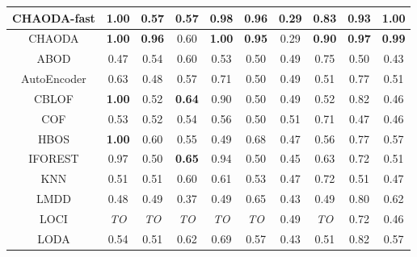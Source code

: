 \begin{table*}[!t]
\begin{center}
\begin{small}
\begin{sc}
\begin{tabular}{|c|c|c|c|c|c|c|c|c|c|}
\hline
CHAODA-fast    & \textbf{1.00} &               0.57 &          0.57 &     \textbf{0.98} & \textbf{0.96} &          0.29 &   \textbf{0.83} &          0.93 & \textbf{1.00} \\
\hline
CHAODA         & \textbf{1.00} &      \textbf{0.96} &          0.60 &     \textbf{1.00} & \textbf{0.95} &          0.29 &   \textbf{0.90} & \textbf{0.97} & \textbf{0.99} \\
\hline
ABOD           &          0.47 &               0.54 &          0.60 &              0.53 &          0.50 &          0.49 &            0.75 &          0.50 &          0.43 \\
\hline
AutoEncoder    &          0.63 &               0.48 &          0.57 &              0.71 &          0.50 &          0.49 &            0.51 &          0.77 &          0.51 \\
\hline
CBLOF          & \textbf{1.00} &               0.52 & \textbf{0.64} &              0.90 &          0.50 &          0.49 &            0.52 &          0.82 &          0.46 \\
\hline
COF            &          0.53 &               0.52 &          0.54 &              0.56 &          0.50 &          0.51 &            0.71 &          0.47 &          0.46 \\
\hline
HBOS           & \textbf{1.00} &               0.60 &          0.55 &              0.49 &          0.68 &          0.47 &            0.56 &          0.77 &          0.57 \\
\hline
IFOREST        &          0.97 &               0.50 & \textbf{0.65} &              0.94 &          0.50 &          0.45 &            0.63 &          0.72 &          0.51 \\
\hline
KNN            &          0.51 &               0.51 &          0.60 &              0.61 &          0.53 &          0.47 &            0.72 &          0.51 &          0.47 \\
\hline
LMDD           &          0.48 &               0.49 &          0.37 &              0.49 &          0.65 &          0.43 &            0.49 &          0.80 &          0.62 \\
\hline
LOCI           &   \textit{TO} &        \textit{TO} &   \textit{TO} &       \textit{TO} &   \textit{TO} &          0.49 &     \textit{TO} &          0.72 &          0.46 \\
\hline
LODA           &          0.54 &               0.51 &          0.62 &              0.69 &          0.57 &          0.43 &            0.51 &          0.82 &          0.57 \\

\end{tabular}
\end{sc}
\end{small}
\end{center}
\end{table*}
